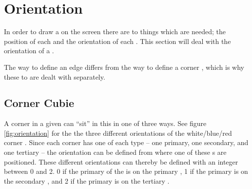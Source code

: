 \section{Orientation}
In order to draw a \rubik{} on the screen there are to things which are needed; the position of each \cubie{} and the orientation of each \cubie{}. This section will deal with the orientation of a \cubie{}.

The way to define an edge \cubie{} differs from the way to define a corner \cubie{}, which is why these to are dealt with separately.

\subsection{Corner Cubie}
A corner \cubie{} in a given \cubicle{} can ``sit'' in this \cubicle{} in one of three ways. See figure \ref{fig:orientation} for the the three different orientations of the white/blue/red corner \cubie{}.
Since each corner \cubie{} has one of each \facelet{} type -- one primary, one secondary, and one tertiary -- the orientation can be defined from where one of these \facelet{}s are positioned.
These different orientations can thereby be defined with an integer between 0 and 2.
0 if the primary \facelet{} of the \cubie{} is on the primary \face{}, 1 if the primary \facelet{} is on the secondary \face{}, and 2 if the primary \facelet{} is on the tertiary \face{}.

